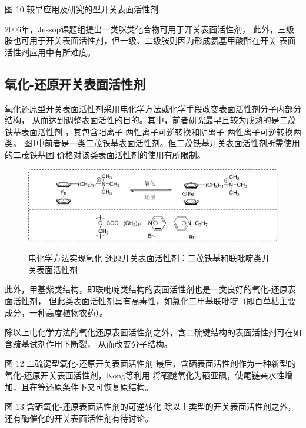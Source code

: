 \documentclass[bachelor,adobefonts]{jnuthesis} %
\begin{document}
    图 10 较早应用及研究的型开关表面活性剂
    
    2006年，Jessop课题组\cite{liu2006science}提出一类脒类化合物可用于开关表面活性剂，
    此外，三级胺也可用于开关表面活性剂，但一级、二级胺则因为形成氨基甲酸酯在开关
    表面活性剂应用中有所难度\cite{jessop2012}。
    \subsection{氧化-还原开关表面活性剂}
    氧化还原型开关表面活性剂采用电化学方法或化学手段改变表面活性剂分子内部分结构，
    从而达到调整表面活性的目的。其中，前者研究最早且较为成熟的是二茂铁基表面活性剂
    ，其包含阳离子-两性离子可逆转换和阴离子-两性离子可逆转换两类\cite{李云霞2011}。
    图\ref{fig:switchable-redox-cp2fe}中前者是一类二茂铁基表面活性剂。但二茂铁基开关表面活性剂所需使用的二茂铁基团
    价格对该类表面活性剂的使用有所限制。
    
    \begin{figure}[htbp]
        \centering
        \includegraphics[width= \textwidth]{Figure/switchable-cp2fe.pdf}\\
        \caption{电化学方法实现氧化-还原开关表面活性剂：二茂铁基和联吡啶类开关表面活性剂}\label{fig:switchable-redox-cp2fe}
    \end{figure}
   
    此外，甲基紫类结构，即联吡啶类结构的表面活性剂也是一类良好的氧化-还原表面活性剂，
    但此类表面活性剂具有高毒性，如氯化二甲基联吡啶（即百草枯主要成分，一种高度植物农药）。
    
    除以上电化学方法的氧化还原表面活性剂之外，含二硫键结构的表面活性剂可在如含巯基试剂作用下断裂，
    从而改变分子结构。
    
    图 12 二硫键型氧化-还原开关表面活性剂
    最后，含硒表面活性剂作为一种新型的氧化-还原开关表面活性剂，Kong等\cite{kong2016redox}利用
    将硒醚氧化为硒亚砜，使尾链亲水性增加，且在等还原条件下又可恢复原结构。
    
    图 13 含硒氧化-还原表面活性剂的可逆转化\cite{kong2016redox}
    除以上类型的开关表面活性剂之外，还有酶催化\cite{ku2011}的开关表面活性剂有待讨论。
    
\end{document}
